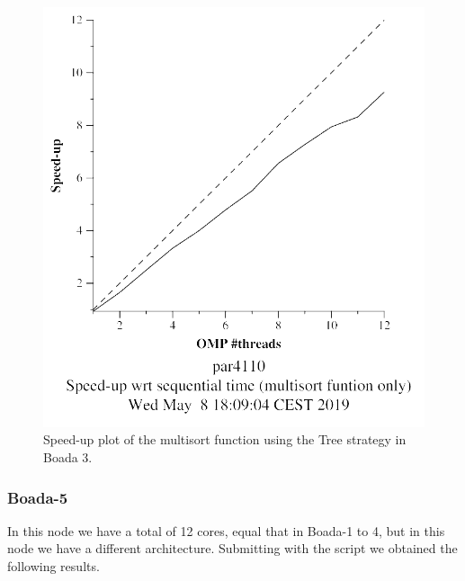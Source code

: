 \documentclass[12pt, a4paper]{article}
\begin{document}
\begin{figure}[H]
\begin{minipage}[b]{0.4\linewidth}
  \includegraphics[scale=0.5]{./images/S2/S2_strong_scalability/multisort-omp-strong_boada-3_tree_multisort_only}
  \caption{Speed-up plot of the multisort function using the Tree strategy in Boada 3.}
  \label{fig:mandel-omp-10000-strong-21-speedup}
\end{minipage}
\end{figure}

\subsubsection{Boada-5}

In this node we have a total of 12 cores, equal that in Boada-1 to 4, but in this node we have a different architecture. Submitting with the script we obtained the following results.
\end{document}
